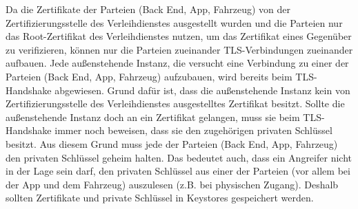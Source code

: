 Da die Zertifikate der Parteien (Back End, App, Fahrzeug) von der Zertifizierungsstelle des Verleihdienstes ausgestellt wurden und die Parteien nur das Root-Zertifikat des Verleihdienstes nutzen, um das Zertifikat eines Gegenüber zu verifizieren, können nur die Parteien zueinander TLS-Verbindungen zueinander aufbauen. Jede außenstehende Instanz, die versucht eine Verbindung zu einer der Parteien (Back End, App, Fahrzeug) aufzubauen, wird bereits beim TLS-Handshake abgewiesen. Grund dafür ist, dass die außenstehende Instanz kein von Zertifizierungsstelle des Verleihdienstes ausgestelltes Zertifikat besitzt. Sollte die außenstehende Instanz doch an ein Zertifikat gelangen, muss sie beim TLS-Handshake immer noch beweisen, dass sie den zugehörigen privaten Schlüssel besitzt. Aus diesem Grund muss jede der Parteien (Back End, App, Fahrzeug) den privaten Schlüssel geheim halten. Das bedeutet auch, dass ein Angreifer nicht in der Lage sein darf, den privaten Schlüssel aus einer der Parteien (vor allem bei der App und dem Fahrzeug) auszulesen (z.B. bei physischen Zugang). Deshalb sollten Zertifikate und private Schlüssel in Keystores gespeichert werden.